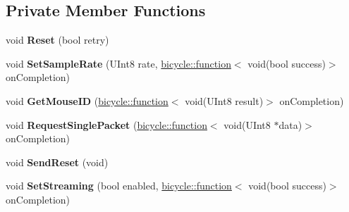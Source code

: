 \subsection*{Private Member Functions}
\begin{DoxyCompactItemize}
\item 
\mbox{\label{class_standard_p_c___internal_1_1_p_s2_mouse_aaa412a60b872099ac25b1be0cfdd6582}} 
void {\bfseries Reset} (bool retry)
\item 
\mbox{\label{class_standard_p_c___internal_1_1_p_s2_mouse_a834421ca76ef28c6ddb154eef77d17e5}} 
void {\bfseries Set\+Sample\+Rate} (U\+Int8 rate, \hyperlink{classbicycle_1_1function}{bicycle\+::function}$<$ void(bool success)$>$ on\+Completion)
\item 
\mbox{\label{class_standard_p_c___internal_1_1_p_s2_mouse_a3ad21c3888a316313660df2b9038fecc}} 
void {\bfseries Get\+Mouse\+ID} (\hyperlink{classbicycle_1_1function}{bicycle\+::function}$<$ void(U\+Int8 result)$>$ on\+Completion)
\item 
\mbox{\label{class_standard_p_c___internal_1_1_p_s2_mouse_add73b19f913ed27de626cdd975a74150}} 
void {\bfseries Request\+Single\+Packet} (\hyperlink{classbicycle_1_1function}{bicycle\+::function}$<$ void(U\+Int8 $\ast$data)$>$ on\+Completion)
\item 
\mbox{\label{class_standard_p_c___internal_1_1_p_s2_mouse_a2cd0b2445c1135760f82bc23e49564a6}} 
void {\bfseries Send\+Reset} (void)
\item 
\mbox{\label{class_standard_p_c___internal_1_1_p_s2_mouse_a7a4f3add7ea0722d13ccffd961576e9f}} 
void {\bfseries Set\+Streaming} (bool enabled, \hyperlink{classbicycle_1_1function}{bicycle\+::function}$<$ void(bool success)$>$ on\+Completion)
\end{DoxyCompactItemize}
